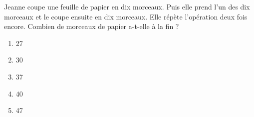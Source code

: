 Jeanne coupe une feuille de papier en dix morceaux. Puis elle prend l'un des dix morceaux et le coupe ensuite en dix morceaux. Elle répète l'opération deux fois encore. Combien de morceaux de papier a-t-elle à la fin ?
\begin{multicols}{5}
  \begin{enumerate}[A/]
  \item 27
  \item 30
  \item 37
  \item 40
  \item 47
  \end{enumerate}
\end{multicols}